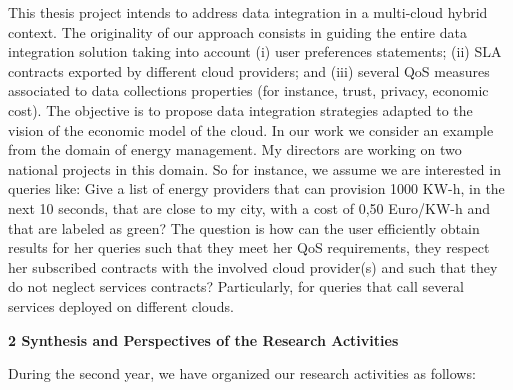 \documentclass[11pt,a4paper,oneside]{report}
\begin{document}
This thesis project intends to address data integration in a multi-cloud hybrid context. The originality of our approach consists in guiding the entire data integration solution taking into account (i) user preferences statements; (ii) SLA contracts exported by different cloud providers; and (iii) several QoS measures associated to data collections properties (for instance, trust, privacy, economic cost). The objective is to propose data integration strategies adapted to the vision of the economic model of the cloud.
%
In our work we consider an example from the domain of energy management. My directors are working on two national projects in this domain. So for instance, we assume we are interested in queries like: Give a list of energy providers that can provision 1000 KW-h, in the next 10 seconds, that are close to my city, with a cost of 0,50 Euro/KW-h and that are labeled as green? The question is how can the user efficiently obtain results for her queries such that they meet her QoS requirements, they respect her subscribed contracts with the involved cloud provider(s) and such that they do not neglect services contracts? Particularly, for queries that call several services deployed on different clouds. 
 
\begin{flushleft}
\textbf{2 Synthesis and Perspectives of the Research Activities}\\
\end{flushleft}
During the second year, we have organized our research activities as follows:
\end{document}
